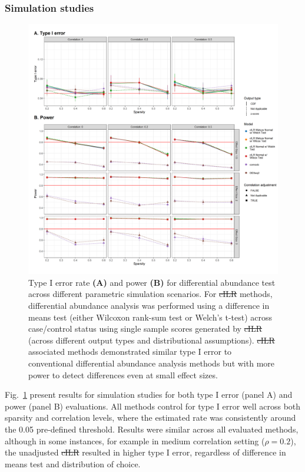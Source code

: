 \documentclass[10pt,letterpaper]{article}
\providecommand{\DIFaddtex}[1]{{\protect\color{blue}\uwave{#1}}} %
\providecommand{\DIFdeltex}[1]{{\protect\color{red}\sout{#1}}}                      %
\providecommand{\DIFaddbegin}{} %
\providecommand{\DIFaddend}{} %
\providecommand{\DIFdelbegin}{} %
\providecommand{\DIFdelend}{} %
\providecommand{\DIFaddFL}[1]{\DIFadd{#1}} %
\providecommand{\DIFdelFL}[1]{\DIFdel{#1}} %
\providecommand{\DIFaddbeginFL}{} %
\providecommand{\DIFaddendFL}{} %
\providecommand{\DIFdelbeginFL}{} %
\providecommand{\DIFdelendFL}{} %
\providecommand{\DIFadd}[1]{\texorpdfstring{\DIFaddtex{#1}}{#1}} %
\providecommand{\DIFdel}[1]{\texorpdfstring{\DIFdeltex{#1}}{}} %
\newcommand{\DIFscaledelfig}{0.5}
\newlength{\DIFdelgraphicswidth} %
\newlength{\DIFdelgraphicsheight} %
\newcommand{\DIFaddincludegraphics}[2][]{{\color{blue}\fbox{\DIFOincludegraphics[#1]{#2}}}} %
\newcommand{\DIFdelincludegraphics}[2][]{%
\sbox{\DIFdelgraphicsbox}{\DIFOincludegraphics[#1]{#2}}%
\settoboxwidth{\DIFdelgraphicswidth}{\DIFdelgraphicsbox} %
\settoboxtotalheight{\DIFdelgraphicsheight}{\DIFdelgraphicsbox} %
\scalebox{\DIFscaledelfig}{%
\parbox[b]{\DIFdelgraphicswidth}{\usebox{\DIFdelgraphicsbox}\\[-\baselineskip] \rule{\DIFdelgraphicswidth}{0em}}\llap{\resizebox{\DIFdelgraphicswidth}{\DIFdelgraphicsheight}{%
\setlength{\unitlength}{\DIFdelgraphicswidth}%
\begin{picture}(1,1)%
\thicklines\linethickness{2pt} %
{\color[rgb]{1,0,0}\put(0,0){\framebox(1,1){}}}%
{\color[rgb]{1,0,0}\put(0,0){\line( 1,1){1}}}%
{\color[rgb]{1,0,0}\put(0,1){\line(1,-1){1}}}%
\end{picture}%
}\hspace*{3pt}}} %
} %
\DeclareRobustCommand{\DIFaddbegin}{\DIFOaddbegin \let\includegraphics\DIFaddincludegraphics} %
\DeclareRobustCommand{\DIFaddend}{\DIFOaddend \let\includegraphics\DIFOincludegraphics} %
\DeclareRobustCommand{\DIFdelbegin}{\DIFOdelbegin \let\includegraphics\DIFdelincludegraphics} %
\DeclareRobustCommand{\DIFdelend}{\DIFOaddend \let\includegraphics\DIFOincludegraphics} %
\DeclareRobustCommand{\DIFaddbeginFL}{\DIFOaddbeginFL \let\includegraphics\DIFaddincludegraphics} %
\DeclareRobustCommand{\DIFaddendFL}{\DIFOaddendFL \let\includegraphics\DIFOincludegraphics} %
\DeclareRobustCommand{\DIFdelbeginFL}{\DIFOdelbeginFL \let\includegraphics\DIFdelincludegraphics} %
\DeclareRobustCommand{\DIFdelendFL}{\DIFOaddendFL \let\includegraphics\DIFOincludegraphics} %
\begin{document}
\subsubsection*{Simulation studies}
\begin{figure}[!h]
    \centering
    \includegraphics[width = \textwidth]{figures/sim_diff_ab_comb.png}
    \caption{Type I error rate \textbf{(A)} and power \textbf{(B)} for differential abundance test across different parametric simulation scenarios. For \DIFdelbeginFL \DIFdelFL{cILR }\DIFdelendFL \DIFaddbeginFL \DIFaddFL{CBEA }\DIFaddendFL methods, differential abundance analysis was performed using a difference in means test (either Wilcoxon rank-sum test or Welch's t-test) across case/control status using single sample scores generated by \DIFdelbeginFL \DIFdelFL{cILR }\DIFdelendFL \DIFaddbeginFL \DIFaddFL{CBEA }\DIFaddendFL (across different output types and distributional assumptions). \DIFdelbeginFL \DIFdelFL{cILR }\DIFdelendFL \DIFaddbeginFL \DIFaddFL{CBEA }\DIFaddendFL associated methods demonstrated similar type I error to conventional differential abundance analysis methods but with more power to detect differences even at small effect sizes.} 
    \label{fig:4}
\end{figure}

Fig.~\ref{fig:4} present results for simulation studies for both type I error (panel A) and power (panel B) evaluations. All methods control for type I error well across both sparsity and correlation levels, where the estimated rate was consistently around the 0.05 pre-defined threshold. Results were similar across all evaluated methods, although in some instances, for example in medium correlation setting ($\rho = 0.2$), the unadjusted \DIFdelbegin \DIFdel{cILR }\DIFdelend \DIFaddbegin \DIFadd{CBEA }\DIFaddend resulted in higher type I error, regardless of difference in means test and distribution of choice. 
\end{document}
